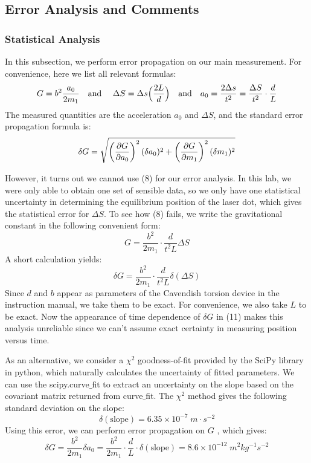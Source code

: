 \documentclass{article}
\begin{document}
\subsection{Error Analysis and Comments}
\subsubsection{Statistical Analysis}
In this subsection, we perform error propagation on our main measurement. For convenience, here we list all relevant formulas: 
		\begin{equation}
			G = b^2 \frac{a_0}{2m_1} \qq{and } \Delta S = \Delta s \Big(\frac{2L}{d}\Big) \qq{and}a_0 = \frac{2\Delta s}{t^2} = \frac{\Delta S }{t^2 } \cdot \frac{d}{L}
		\end{equation}
The measured quantities are the acceleration $a_0$ and $\Delta S$, and the standard error propagation formula is:
	\begin{equation}
		\delta G = \sqrt{\left(\pdv{G}{a_0} \right)^2 (\delta a_0)^2 + \left(\pdv{G}{m_1} \right)^2 (\delta m_1)^2 } 
	\end{equation}
 
However, it turns out we cannot use (8) for our error analysis. In this lab, we were only able to obtain one set of sensible data, so we only have one statistical uncertainty in determining the equilibrium position of the laser dot, which gives the statistical error for $\Delta S$. To see how (8) fails, we write the gravitational constant in the following convenient form:
	\begin{equation}
		G = \frac{b^2}{2m_1} \cdot \frac{d}{t^2 L} \Delta S
	\end{equation}
A short calculation yields:
	\begin{equation}
		\delta G = \frac{b^2}{2m_1} \cdot \frac{d}{t^2 L} \delta (\Delta S)
	\end{equation}
Since $d$ and $b$ appear as parameters of the Cavendish torsion device in the instruction manual, we take them to be exact. For convenience, we also take $L$ to be exact. Now the appearance of time dependence of $\delta G$ in (11) makes this analysis unreliable since we can't assume exact certainty in measuring position versus time. 

As an alternative, we consider a $\chi^2$ goodness-of-fit provided by the SciPy library in python, which naturally calculates the uncertainty of fitted parameters. We can use the scipy.curve$\_$fit to extract an uncertainty on the slope based on the covariant matrix returned from curve$\_$fit. The $\chi^2$ method gives the following standard deviation on the slope:
    \begin{equation}
        \delta (\text{slope}) = 6.35 \times 10^{-7} \;\si{m\cdot s^{-2}}
    \end{equation}
Using this error, we can perform error propagation on $G$
, which gives:
    \begin{equation}
       \delta G = \frac{b^2}{2m_1}\delta a_0 = \frac{b^2}{2m_1}\cdot \frac{d}{L}\cdot \delta (\text{slope}) = 8.6\times10^{-12} \;\si{m^2kg^{-1}s^{-2}}
    \end{equation}
\end{document}
